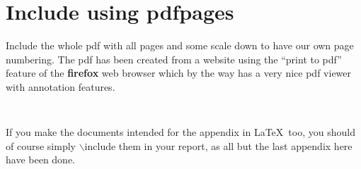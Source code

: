 \chapter{Include using pdfpages}
Include the whole pdf with all pages and some scale down to have our own page numbering.
The pdf has been created from a website using the ``print to pdf'' feature of the \textbf{firefox} web browser which by the way has a very nice pdf viewer with annotation features.
\lstset{language=[LaTeX]TeX}
\begin{lstlisting}[caption={code to include next pages as pdf}]
 
\end{lstlisting}

If you make the documents intended for the appendix in \LaTeX\ too, you should of course simply $\backslash$include them in your report, as all but the last appendix here have been done.
%


